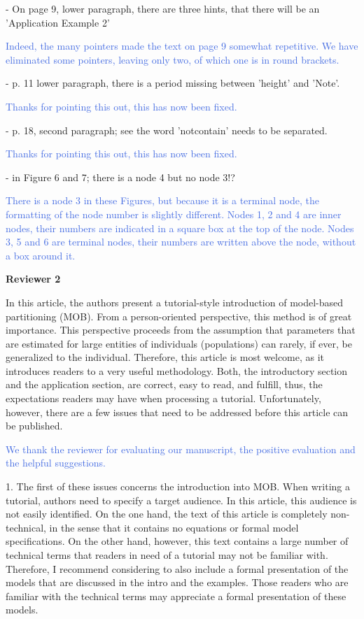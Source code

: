 \documentclass{letter}
\newcommand{\auth}[1]{\textcolor{RoyalBlue}{#1}}
\begin{document}
- On page 9, lower paragraph, there are three hints, that there will be an 'Application Example 2'

\auth{Indeed, the many pointers made the text on page 9 somewhat repetitive. We have eliminated some pointers, leaving only two, of which one is in round brackets.}

- p. 11 lower paragraph, there is a period missing between 'height' and 'Note'.

\auth{Thanks for pointing this out, this has now been fixed.}

- p. 18, second paragraph; see the word 'notcontain' needs to be separated.

\auth{Thanks for pointing this out, this has now been fixed.}

- in Figure 6 and 7; there is a node 4 but no node 3!?

\auth{There is a node 3 in these Figures, but because it is a terminal node, the formatting of the node number is slightly different. Nodes 1, 2 and 4 are inner nodes, their numbers are indicated in a square box at the top of the node. Nodes 3, 5 and 6 are terminal nodes, their numbers are written above the node, without a box around it.}



\textbf{Reviewer 2}

In this article, the authors present a tutorial-style introduction of model-based partitioning (MOB). From a person-oriented perspective, this method is of great importance. This perspective proceeds from the assumption that parameters that are estimated for large entities of individuals (populations) can rarely, if ever, be generalized to the individual. Therefore, this article is most welcome, as it introduces readers to a very useful methodology. Both, the introductory section and the application section, are correct, easy to read, and fulfill, thus, the expectations readers may have when processing a tutorial. Unfortunately, however, there are a few issues that need to be addressed before this article can be published.

\auth{We thank the reviewer for evaluating our manuscript, the positive evaluation and the helpful suggestions.}

1. The first of these issues concerns the introduction into MOB. When writing a tutorial, authors need to specify a target audience. In this article, this audience is not easily identified. On the one hand, the text of this article is completely non-technical, in the sense that it contains no equations or formal model specifications. On the other hand, however, this text contains a large number of technical terms that readers in need of a tutorial may not be familiar with. Therefore, I recommend considering to also include a formal presentation of the models that are discussed in the intro and the examples. Those readers who are familiar with the technical terms may appreciate a formal presentation of these models.
\end{document}
